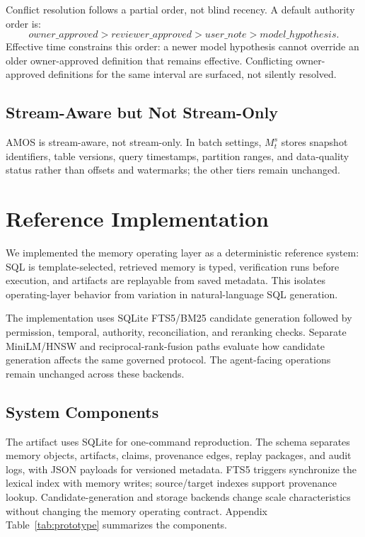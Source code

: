 \documentclass[10pt]{article}
\newcommand{\amos}{\textsc{AMOS}\xspace}
\begin{document}
Conflict resolution follows a partial order, not blind recency. A default authority order is:
\begin{equation}
    owner\_approved > reviewer\_approved > user\_note > model\_hypothesis.
\end{equation}
Effective time constrains this order: a newer model hypothesis cannot override an older owner-approved definition that remains effective. Conflicting owner-approved definitions for the same interval are surfaced, not silently resolved.

\subsection{Stream-Aware but Not Stream-Only}
\amos is stream-aware, not stream-only. In batch settings, $M^s_t$ stores snapshot identifiers, table versions, query timestamps, partition ranges, and data-quality status rather than offsets and watermarks; the other tiers remain unchanged.

\section{Reference Implementation}

We implemented the memory operating layer as a deterministic reference system: SQL is template-selected, retrieved memory is typed, verification runs before execution, and artifacts are replayable from saved metadata. This isolates operating-layer behavior from variation in natural-language SQL generation.

The implementation uses SQLite FTS5/BM25 candidate generation followed by permission, temporal, authority, reconciliation, and reranking checks. Separate MiniLM/HNSW and reciprocal-rank-fusion paths evaluate how candidate generation affects the same governed protocol. The agent-facing operations remain unchanged across these backends.

\subsection{System Components}
The artifact uses SQLite for one-command reproduction. The schema separates memory objects, artifacts, claims, provenance edges, replay packages, and audit logs, with JSON payloads for versioned metadata. FTS5 triggers synchronize the lexical index with memory writes; source/target indexes support provenance lookup. Candidate-generation and storage backends change scale characteristics without changing the memory operating contract. Appendix Table~\ref{tab:prototype} summarizes the components.
\end{document}
